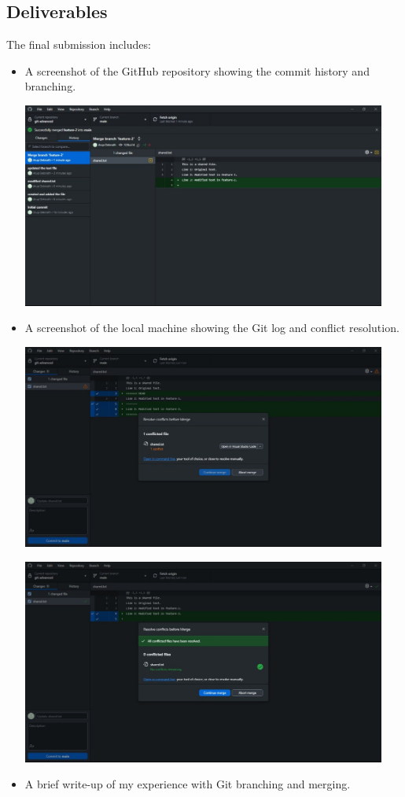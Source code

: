 \subsection{Deliverables}
The final submission includes:
\begin{itemize}
    \item A screenshot of the GitHub repository showing the commit history and branching.
    \begin{center}
        \includegraphics[width=12cm]{images/commit_history.jpeg}
    \end{center}
    
    \item A screenshot of the local machine showing the Git log and conflict resolution.
    \begin{center}
        \includegraphics[width=12cm]{images/conflict.jpeg}
    \end{center}
    
    \begin{center}
        \includegraphics[width=12cm]{images/conflict_solved.jpeg}
    \end{center}
    
    \item A brief write-up of my experience with Git branching and merging.
\end{itemize}

